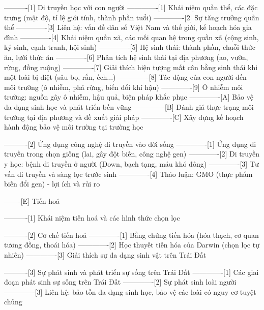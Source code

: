 ----------[1] Di truyền học với con người
-------------[1] Khái niệm quần thể, các đặc trưng (mật độ, tỉ lệ giới tính, thành phần tuổi)
-------------[2] Sự tăng trưởng quần thể
-------------[3] Liên hệ: vấn đề dân số Việt Nam và thế giới, kế hoạch hóa gia đình
-------------[4] Khái niệm quần xã, các mối quan hệ trong quần xã (cộng sinh, ký sinh, cạnh tranh, hội sinh)
-------------[5] Hệ sinh thái: thành phần, chuỗi thức ăn, lưới thức ăn
-------------[6] Phân tích hệ sinh thái tại địa phương (ao, vườn, rừng, đồng ruộng)
-------------[7] Giải thích hiện tượng mất cân bằng sinh thái khi một loài bị diệt (sâu bọ, rắn, ếch...)
-------------[8] Tác động của con người đến môi trường (ô nhiễm, phá rừng, biến đổi khí hậu)
-------------[9] Ô nhiễm môi trường: nguồn gây ô nhiễm, hậu quả, biện pháp khắc phục
-------------[A] Bảo vệ đa dạng sinh học và phát triển bền vững
-------------[B] Đánh giá thực trạng môi trường tại địa phương và đề xuất giải pháp
-------------[C] Xây dựng kế hoạch hành động bảo vệ môi trường tại trường học

----------[2] Ứng dụng công nghệ di truyền vào đời sống
-------------[1] Ứng dụng di truyền trong chọn giống (lai, gây đột biến, công nghệ gen)
-------------[2] Di truyền y học: bệnh di truyền ở người (Down, bạch tạng, máu khó đông)
-------------[3] Tư vấn di truyền và sàng lọc trước sinh
-------------[4] Thảo luận: GMO (thực phẩm biến đổi gen) - lợi ích và rủi ro

-------[E] Tiến hoá

----------[1] Khái niệm tiến hoá và các hình thức chọn lọc

----------[2] Cơ chế tiến hoá
-------------[1] Bằng chứng tiến hóa (hóa thạch, cơ quan tương đồng, thoái hóa)
-------------[2] Học thuyết tiến hóa của Darwin (chọn lọc tự nhiên)
-------------[3] Giải thích sự đa dạng sinh vật trên Trái Đất

----------[3] Sự phát sinh và phát triển sự sống trên Trái Đất
-------------[1] Các giai đoạn phát sinh sự sống trên Trái Đất
-------------[2] Sự phát sinh loài người
-------------[3] Liên hệ: bảo tồn đa dạng sinh học, bảo vệ các loài có nguy cơ tuyệt chủng
